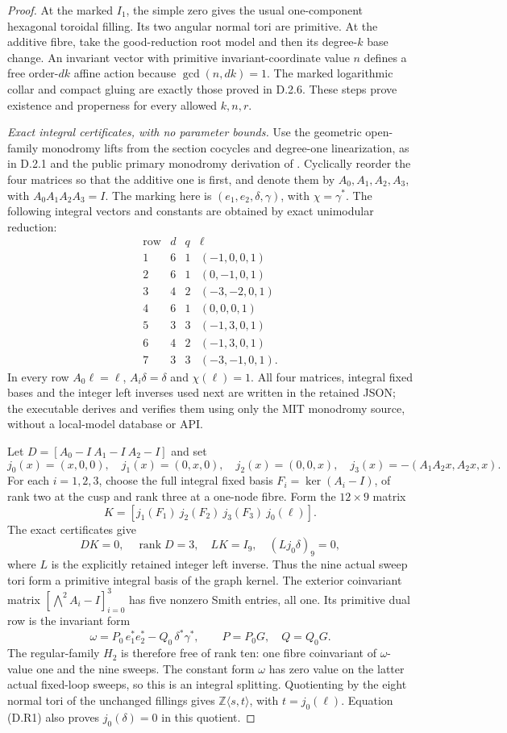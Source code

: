 \begin{proof}
At the marked $I_1$, the simple zero gives the usual one-component
hexagonal toroidal filling. Its two angular normal tori are
primitive. At the additive fibre, take the good-reduction root
model and then its degree-$k$ base change. An invariant vector
with primitive invariant-coordinate value $n$ defines a free
order-$dk$ affine action because $\gcd(n,dk)=1$.
The marked logarithmic collar and compact gluing are exactly
those proved in D.2.6. These steps prove existence and properness
for every allowed $k,n,r$.

\emph{Exact integral certificates, with no parameter bounds.}
Use the geometric open-family monodromy lifts from the section
cocycles and degree-one linearization, as in D.2.1 and the
public primary monodromy derivation of \cite{manExplorer26}.
Cyclically reorder the four matrices so that the additive
one is first, and denote them by $A_0,A_1,A_2,A_3$, with
$A_0A_1A_2A_3=I$.
The marking here is $(e_1,e_2,\delta,\gamma)$, with
$\chi=\gamma^*$. The following integral vectors and constants
are obtained by exact unimodular reduction:
\[
 \begin{array}{c|r|r|l}
 \text{row}&d&q&\ell\\\hline
 1&6&1&(-1,0,0,1)\\
 2&6&1&(0,-1,0,1)\\
 3&4&2&(-3,-2,0,1)\\
 4&6&1&(0,0,0,1)\\
 5&3&3&(-1,3,0,1)\\
 6&4&2&(-1,3,0,1)\\
 7&3&3&(-3,-1,0,1).
 \end{array}
\]
In every row $A_0\ell=\ell$, $A_i\delta=\delta$ and
$\chi(\ell)=1$.
All four matrices, integral fixed bases and the integer
left inverses used next are written in the retained JSON;
the executable derives and verifies them using only the
MIT monodromy source, without a local-model database or API.

Let $D=[A_0-I\ A_1-I\ A_2-I]$ and set
\[
 j_0(x)=(x,0,0),\quad j_1(x)=(0,x,0),\quad
 j_2(x)=(0,0,x),\quad
 j_3(x)=-(A_1A_2x,A_2x,x).
\]
For each $i=1,2,3$, choose the full integral fixed basis
$F_i=\ker(A_i-I)$, of rank two at the cusp and rank three
at a one-node fibre. Form the $12\times9$ matrix
\[
 K=[j_1(F_1)\ j_2(F_2)\ j_3(F_3)\ j_0(\ell)].
\]
The exact certificates give
\[
 DK=0,\quad\operatorname{rank}D=3,\quad LK=I_9,\quad
 (Lj_0\delta)_9=0,
 \tag{D.R1}
\]
where $L$ is the explicitly retained integer left inverse.
Thus the nine actual sweep tori form a primitive integral
basis of the graph kernel. The exterior coinvariant matrix
$[\bigwedge^2A_i-I]_{i=0}^3$ has five nonzero Smith entries,
all one. Its primitive dual row is the invariant form
\[
 \omega=P_0\,e_1^*e_2^*-Q_0\,\delta^*\gamma^*,
 \qquad P=P_0G,\quad Q=Q_0G.
 \tag{D.R2}
\]
The regular-family $H_2$ is therefore free of rank ten:
one fibre coinvariant of $\omega$-value one and the nine
sweeps. The constant form $\omega$ has zero value on the
latter actual fixed-loop sweeps, so this is an integral
splitting. Quotienting by the eight normal tori of the
unchanged fillings gives
$\mathbb Z\langle s,t\rangle$, with $t=j_0(\ell)$.
Equation (D.R1) also proves $j_0(\delta)=0$ in this quotient.


\end{proof}
